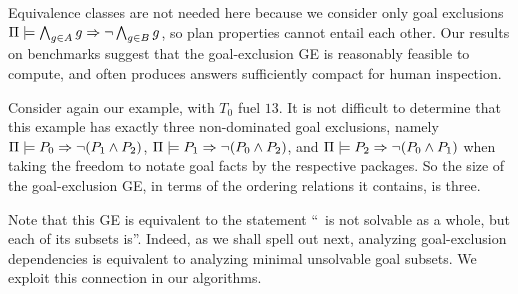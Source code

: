 Equivalence classes are not needed here because we consider only goal
exclusions $\Pi \models \bigwedge_{g \in A} g \Rightarrow \neg \bigwedge_{g
    \in B} g$, so plan properties cannot entail each other.
%
%
%
%
%
%
Our results on benchmarks suggest that the goal-exclusion GE is
reasonably feasible to compute, and often produces answers
sufficiently compact for human inspection.

Consider again our example, with $T_0$ fuel $13$. It is not difficult
to determine that this example has exactly three non-dominated goal
exclusions, namely $\Pi \models P_0 \Rightarrow \neg (P_1 \wedge P_2)$,
$\Pi \models P_1 \Rightarrow \neg (P_0 \wedge P_2)$, and
$\Pi \models P_2 \Rightarrow \neg (P_0 \wedge P_1)$ when taking the freedom
to notate goal facts by the respective packages.
%
%
So the size of the goal-exclusion GE, in terms of the ordering
relations it contains, is three. 

Note that this GE is equivalent to the statement ``\goalsoft\ is not
solvable as a whole, but each of its subsets is''. Indeed, as we shall
spell out next, analyzing goal-exclusion dependencies is equivalent to
analyzing minimal unsolvable goal subsets. We exploit this connection
in our algorithms.
